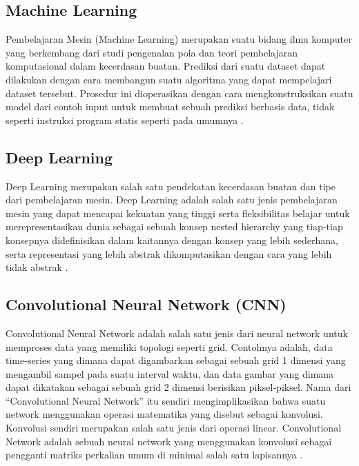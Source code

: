 \subsection{Machine Learning}


Pembelajaran Mesin (Machine Learning) merupakan suatu bidang ilmu komputer yang berkembang dari studi pengenalan pola dan teori pembelajaran komputasional dalam kecerdasan buatan. Prediksi dari suatu dataset dapat dilakukan dengan cara membangun suatu algoritma yang dapat mempelajari dataset tersebut. Prosedur ini dioperasikan dengan cara mengkonstruksikan suatu model dari contoh input untuk membuat sebuah prediksi berbasis data, tidak seperti instruksi program statis seperti pada umumnya \citep{machineL}.

\subsection{Deep Learning}
Deep Learning merupakan salah satu pendekatan kecerdasan buatan dan tipe dari pembelajaran mesin. Deep Learning adalah salah satu jenis pembelajaran mesin yang dapat mencapai kekuatan yang tinggi serta fleksibilitas belajar untuk merepresentasikan dunia sebagai sebuah konsep nested hierarchy yang tiap-tiap konsepnya didefinisikan dalam kaitannya dengan konsep yang lebih sederhana, serta representasi yang lebih abstrak dikomputasikan dengan cara yang lebih tidak abstrak \citep{deepL}.

\subsection{Convolutional Neural Network (CNN)}
Convolutional Neural Network adalah salah satu jenis dari neural network untuk memproses data yang memiliki topologi seperti grid. Contohnya adalah, data time-series yang dimana dapat digambarkan sebagai sebuah grid 1 dimensi yang mengambil sampel pada suatu interval waktu, dan data gambar yang dimana dapat dikatakan sebagai sebuah grid 2 dimensi berisikan piksel-piksel. Nama dari “Convolutional Neural Network” itu sendiri mengimplikasikan bahwa suatu network menggunakan operasi matematika yang disebut sebagai konvolusi. Konvolusi sendiri merupakan salah satu jenis dari operasi linear. Convolutional Network adalah sebuah neural network yang menggunakan konvolusi sebagai pengganti matriks perkalian umum di minimal salah satu lapisannya \citep{deepL}.

